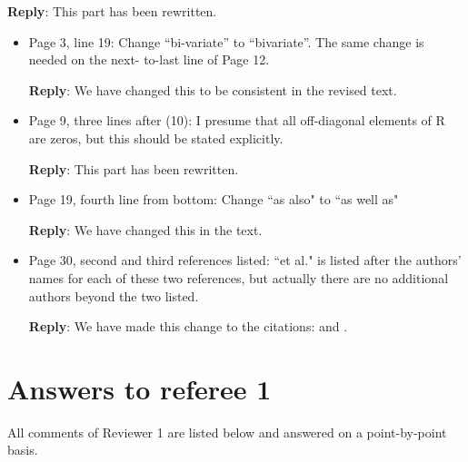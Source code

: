 \documentclass[a4paper]{article}
\def\reply{\textbf{Reply}}
\begin{document}
\reply: This part has been rewritten.

\vspace{1em}



\vspace{5mm}
\begin{itemize}[noitemsep,topsep=0pt,parsep=0pt,partopsep=0pt]

\item Page 3, line 19: Change “bi-variate” to “bivariate”. The same change is needed on the next-
to-last line of Page 12.

\reply: We have changed this to be consistent in the revised text.

\item Page 9, three lines after (10): I presume that all off-diagonal elements of R are zeros, but this
should be stated explicitly.

\reply: This part has been rewritten.

\item Page 19, fourth line from bottom: Change ``as also" to ``as well as"

\reply: We have changed this in the text.

\item Page 30, second and third references listed: ``et al." is listed after the authors’ names for each
of these two references, but actually there are no additional authors beyond the two listed.

\reply: We have made this change to the citations: \cite{genton2015cross} and \cite{french2016credible}.
\end{itemize}


\section*{Answers to referee 1}
All comments of Reviewer 1 are listed below and answered on a point-by-point basis.
\end{document}
